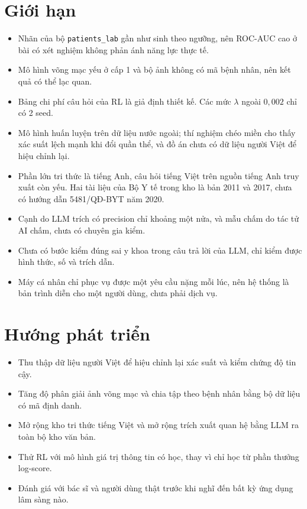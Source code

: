 \section{Giới hạn}

\begin{itemize}
  \item Nhãn của bộ \texttt{patients\_lab} gần như sinh theo ngưỡng, nên ROC-AUC cao ở bài có xét nghiệm không phản ánh năng lực thực tế.
  \item Mô hình võng mạc yếu ở cấp 1 và bộ ảnh không có mã bệnh nhân, nên kết quả có thể lạc quan.
  \item Bảng chi phí câu hỏi của RL là giả định thiết kế. Các mức $\lambda$ ngoài $0{,}002$ chỉ có 2 seed.
  \item Mô hình huấn luyện trên dữ liệu nước ngoài; thí nghiệm chéo miền cho thấy xác suất lệch mạnh khi đổi quần thể, và đồ án chưa có dữ liệu người Việt để hiệu chỉnh lại.
  \item Phần lớn tri thức là tiếng Anh, câu hỏi tiếng Việt trên nguồn tiếng Anh truy xuất còn yếu. Hai tài liệu của Bộ Y tế trong kho là bản 2011 và 2017, chưa có hướng dẫn 5481/QĐ-BYT năm 2020.
  \item Cạnh do LLM trích có precision chỉ khoảng một nửa, và mẫu chấm do tác tử AI chấm, chưa có chuyên gia kiểm.
  \item Chưa có bước kiểm đúng sai y khoa trong câu trả lời của LLM, chỉ kiểm được hình thức, số và trích dẫn.
  \item Máy cá nhân chỉ phục vụ được một yêu cầu nặng mỗi lúc, nên hệ thống là bản trình diễn cho một người dùng, chưa phải dịch vụ.
\end{itemize}

\section{Hướng phát triển}

\begin{itemize}
  \item Thu thập dữ liệu người Việt để hiệu chỉnh lại xác suất và kiểm chứng độ tin cậy.
  \item Tăng độ phân giải ảnh võng mạc và chia tập theo bệnh nhân bằng bộ dữ liệu có mã định danh.
  \item Mở rộng kho tri thức tiếng Việt và mở rộng trích xuất quan hệ bằng LLM ra toàn bộ kho văn bản.
  \item Thử RL với mô hình giá trị thông tin có học, thay vì chỉ học từ phần thưởng log-score.
  \item Đánh giá với bác sĩ và người dùng thật trước khi nghĩ đến bất kỳ ứng dụng lâm sàng nào.
\end{itemize}
